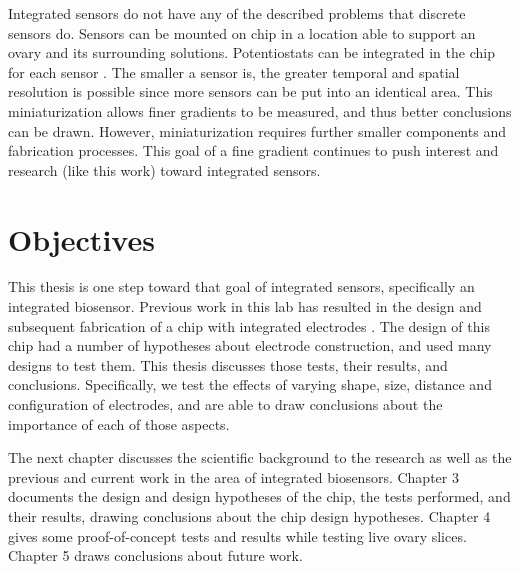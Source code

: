Integrated sensors do not have any of the described problems that discrete sensors do. Sensors can be mounted on chip in a location able to support an ovary and its surrounding solutions. Potentiostats can be integrated in the chip for each sensor \cite{murari2005ipn} \cite{stanacevic2007vpa} \cite{zhang2005eam}. The smaller a sensor is, the greater temporal and spatial resolution is possible since more sensors can be put into an identical area. This miniaturization allows finer gradients to be measured, and thus better conclusions can be drawn. However, miniaturization requires further smaller components and fabrication processes. This goal of a fine gradient continues to push interest and research (like this work) toward integrated sensors.

\section{Objectives}

This thesis is one step toward that goal of integrated sensors, specifically an integrated biosensor. Previous work in this lab has resulted in the design and subsequent fabrication of a chip with integrated electrodes \cite{karegar2007ema}. The design of this chip had a number of hypotheses about electrode construction, and used many designs to test them. This thesis discusses those tests, their results, and conclusions. Specifically, we test the effects of varying shape, size, distance and configuration of electrodes, and are able to draw conclusions about the importance of each of those aspects.

The next chapter discusses the scientific background to the research as well as the previous and current work in the area of integrated biosensors. Chapter 3 documents the design and design hypotheses of the chip, the tests performed, and their results, drawing conclusions about the chip design hypotheses. Chapter 4 gives some proof-of-concept tests and results while testing live ovary slices. Chapter 5 draws conclusions about future work.
